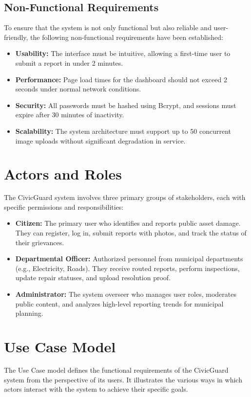 \subsection{Non-Functional Requirements}
To ensure that the system is not only functional but also reliable and user-friendly, the following non-functional requirements have been established:
\begin{itemize}
    \item \textbf{Usability:} The interface must be intuitive, allowing a first-time user to submit a report in under 2 minutes.
    \item \textbf{Performance:} Page load times for the dashboard should not exceed 2 seconds under normal network conditions.
    \item \textbf{Security:} All passwords must be hashed using Bcrypt, and sessions must expire after 30 minutes of inactivity.
    \item \textbf{Scalability:} The system architecture must support up to 50 concurrent image uploads without significant degradation in service.
\end{itemize}

\section{Actors and Roles}
The CivicGuard system involves three primary groups of stakeholders, each with specific permissions and responsibilities:
\begin{itemize}
    \item \textbf{Citizen:} The primary user who identifies and reports public asset damage. They can register, log in, submit reports with photos, and track the status of their grievances.
    \item \textbf{Departmental Officer:} Authorized personnel from municipal departments (e.g., Electricity, Roads). They receive routed reports, perform inspections, update repair statuses, and upload resolution proof.
    \item \textbf{Administrator:} The system overseer who manages user roles, moderates public content, and analyzes high-level reporting trends for municipal planning.
\end{itemize}

\section{Use Case Model}
The Use Case model defines the functional requirements of the CivicGuard system from the perspective of its users. It illustrates the various ways in which actors interact with the system to achieve their specific goals.

